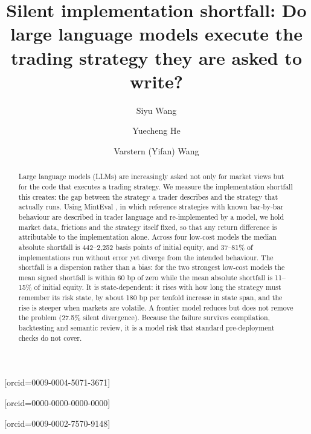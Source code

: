\documentclass[a4paper,fleqn]{cas-sc}
\begin{document}
\let\WriteBookmarks\relax
\def\floatpagepagefraction{1}
\def\textpagefraction{.001}

\title[mode = title]{Silent implementation shortfall: Do large language models execute the trading strategy they are asked to write?}

\author[1]{Siyu Wang}[orcid=0009-0004-5071-3671]

\author[1]{Yuecheng He}[orcid=0000-0000-0000-0000]

\author[1,2,3]{Varstern (Yifan) Wang}[orcid=0009-0002-7570-9148]
\cormark[1]



\begin{abstract}
Large language models (LLMs) are increasingly asked not only for market views but for the code that executes a trading strategy. We measure the implementation shortfall this creates: the gap between the strategy a trader describes and the strategy that actually runs. Using MintEval \citep{wang2026minteval}, in which reference strategies with known bar-by-bar behaviour are described in trader language and re-implemented by a model, we hold market data, frictions and the strategy itself fixed, so that any return difference is attributable to the implementation alone. Across four low-cost models the median absolute shortfall is 442--2{,}252 basis points of initial equity, and 37--81\% of implementations run without error yet diverge from the intended behaviour. The shortfall is a dispersion rather than a bias: for the two strongest low-cost models the mean signed shortfall is within 60 bp of zero while the mean absolute shortfall is 11--15\% of initial equity. It is state-dependent: it rises with how long the strategy must remember its risk state, by about 180 bp per tenfold increase in state span, and the rise is steeper when markets are volatile. A frontier model reduces but does not remove the problem (27.5\% silent divergence). Because the failure survives compilation, backtesting and semantic review, it is a model risk that standard pre-deployment checks do not cover.
\end{abstract}
\end{document}
